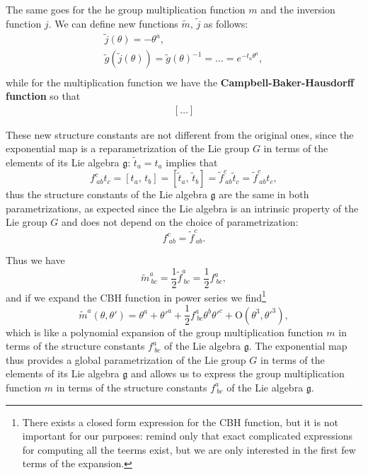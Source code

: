 The same goes for the he group multiplication function \(m\) and the inversion function \(j\). We can define new functions \(\tilde{m}\), \(\tilde{j}\) as follows:
\[
    \begin{aligned}
        \tilde{j}(\theta) = - \theta^a,                                                    \\
        \tilde{g}(\tilde{j}(\theta)) = \tilde{g}(\theta)^{-1} = \dots = e^{-t_a \theta^a}, \\
    \end{aligned}
\]
while for the multiplication function we have the \textbf{Campbell-Baker-Hausdorff function} so that
\[
    \begin{aligned}
        [\dots ]
    \end{aligned}
\]

These new structure constants are not different from the original ones, since the exponential map is a reparametrization of the Lie group \(G\) in terms of the elements of its Lie algebra \(\mathfrak{g}\): \(\tilde{t}_a = t_a\) implies that
\[
    f^c_{\ ab} t_c = \left[ t_a,\,t_b \right] = \left[ \tilde{t}_a,\,\tilde{t}_b \right] = \tilde{f}^c_{\ ab} \tilde{t}_c = \tilde{f}^c_{\ ab} t_c,
\]
thus the structure constants of the Lie algebra \(\mathfrak{g}\) are the same in both parametrizations, as expected since the Lie algebra is an intrinsic property of the Lie group \(G\) and does not depend on the choice of parametrization:
\[
    f^c_{\ ab} = \tilde{f}^c_{\ ab}.
\]

Thus we have
\[
    \tilde{m}^a_{\ bc} = \frac{1}{2} \tilde{f}^a_{\ bc} = \frac{1}{2} f^a_{\ bc},
\]
and if we expand the CBH function in power series we find\footnote{There exists a closed form expression for the CBH function, but it is not important for our purposes: remind only that exact complicated  expressions for computing all the teerms exist, but we are only interested in the first few terms of the expansion.}
\[
    \tilde{m}^a(\theta, \theta') = \theta^a + \theta'^a + \frac{1}{2} f^a_{\ bc} \theta^b \theta'^c + \mathrm{O}(\theta^3, \theta'^3),
\]
which is like a polynomial expansion of the group multiplication function \(m\) in terms of the structure constants \(f^a_{\ bc}\) of the Lie algebra \(\mathfrak{g}\). The exponential map thus provides a global parametrization of the Lie group \(G\) in terms of the elements of its Lie algebra \(\mathfrak{g}\) and allows us to express the group multiplication function \(m\) in terms of the structure constants \(f^a_{\ bc}\) of the Lie algebra \(\mathfrak{g}\).

